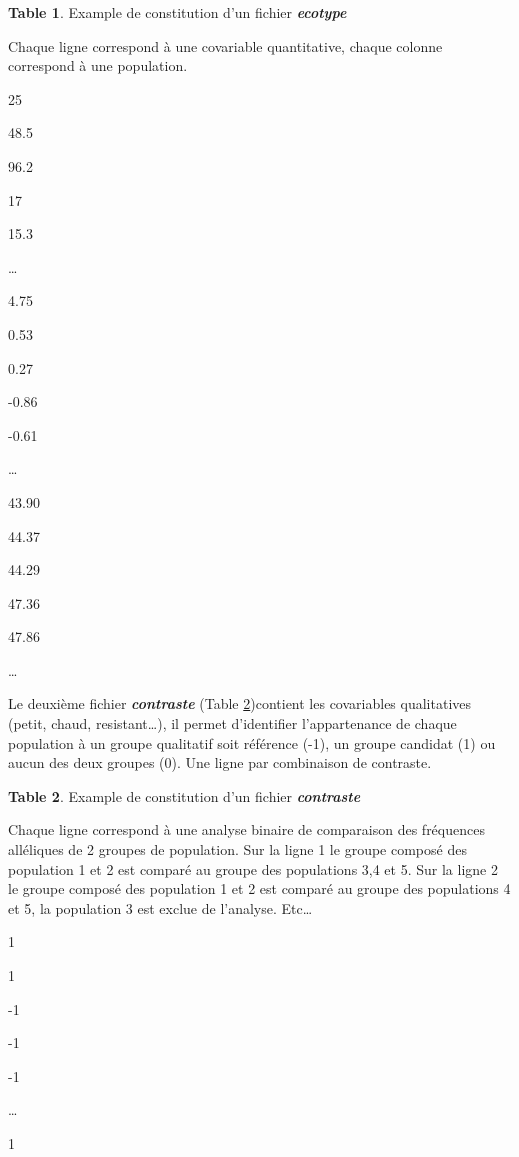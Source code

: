 \documentclass[
  openany]{book}
\theoremstyle{definition}
\newtheorem{definition}{Table}[chapter]
\theoremstyle{definition}
\theoremstyle{definition}
\theoremstyle{definition}
\theoremstyle{remark}
\begin{document}
\begin{definition}
\protect\hypertarget{def:table1}{}\label{def:table1}{Example de constitution d'un fichier \textbf{\emph{ecotype}}}
\end{definition}

Chaque ligne correspond à une covariable quantitative, chaque colonne correspond à une population.

25

48.5

96.2

17

15.3

\ldots{}

4.75

0.53

0.27

-0.86

-0.61

\ldots{}

43.90

44.37

44.29

47.36

47.86

\ldots{}

Le deuxième fichier \textbf{\emph{contraste}} (Table \ref{def:table2})contient les covariables qualitatives (petit, chaud, resistant\ldots), il permet d'identifier l'appartenance de chaque population à un groupe qualitatif soit référence (-1), un groupe candidat (1) ou aucun des deux groupes (0). Une ligne par combinaison de contraste.

\begin{definition}
\protect\hypertarget{def:table2}{}\label{def:table2}{Example de constitution d'un fichier \textbf{\emph{contraste}}}
\end{definition}

Chaque ligne correspond à une analyse binaire de comparaison des fréquences alléliques de 2 groupes de population.
Sur la ligne 1 le groupe composé des population 1 et 2 est comparé au groupe des populations 3,4 et 5.
Sur la ligne 2 le groupe composé des population 1 et 2 est comparé au groupe des populations 4 et 5, la population 3 est exclue de l'analyse.
Etc\ldots{}

1

1

-1

-1

-1

\ldots{}

1
\end{document}
